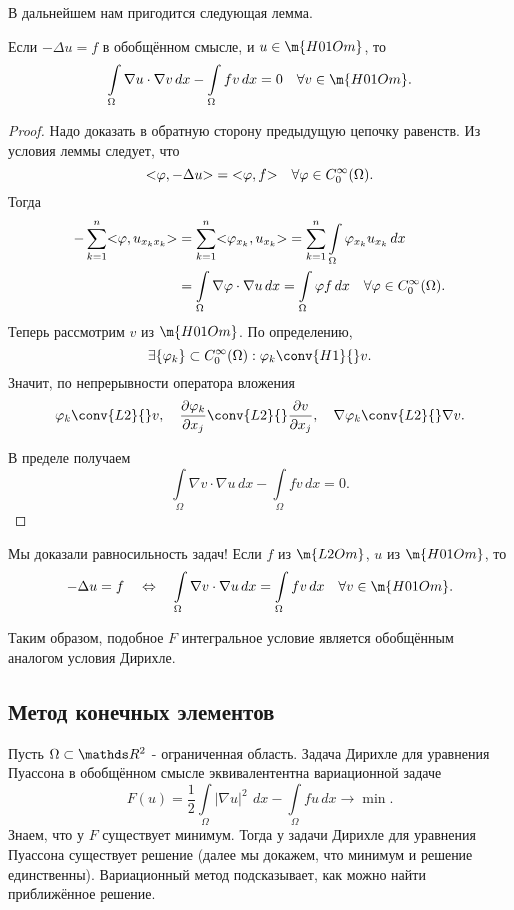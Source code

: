 В дальнейшем нам пригодится следующая лемма.
\begin{lemma}
Если $-\Delta u = f$ в обобщённом смысле, и $u \in \m{H01Om}$, то
$$ \int \limits_\Omega \nabla u \cdot \nabla v \, dx - \int \limits_\Omega fv \, dx = 0 \quad \forall v \in \m{H01Om}.$$
\end{lemma}
\begin{proof} Надо доказать в обратную сторону предыдущую цепочку равенств. Из условия леммы следует, что 
$$ \action{\varphi, -\Delta u} = \action{\varphi, f} \quad \forall \varphi \in C_0^\infty(\Omega).$$
Тогда 
\begin{align*}
- \sum_{k=1}^n \action{\varphi, u_{x_k x_k}} &= \sum_{k=1}^n \action{\varphi_{x_k}, u_{x_k}} = \sum_{k=1}^n \int \limits_\Omega \varphi_{x_k} u_{x_k} \, dx \\
&= \int \limits_\Omega \nabla \varphi \cdot \nabla u \, dx = \int \limits_\Omega \varphi f \, dx \quad \forall \varphi \in C_0^\infty(\Omega).
\end{align*}
Теперь рассмотрим $v$ из $\m{H01Om}$. По определению,
$$ \exists \{ \varphi_k \} \subset C_0^\infty(\Omega) : \varphi_k \conv{H1}{} v.$$
Значит, по непрерывности оператора вложения
$$ \varphi_k \conv{L2}{} v, \quad \pder[\varphi_k]{x_j} \conv{L2}{} \pder[v]{x_j}, \quad \nabla \varphi_k \conv{L2}{} \nabla v.$$

В пределе получаем
$$ \int \limits_\Omega \nabla v \cdot \nabla u \, dx - \int \limits_\Omega fv \, dx = 0.$$

\end{proof}

\begin{note} Мы доказали равносильность задач! Если $f$ из $\m{L2Om}$, $u$ из $\m{H01Om}$, то
$$ -\Delta u = f \quad \Leftrightarrow \quad \int \limits_\Omega \nabla v \cdot \nabla u \, dx = \int \limits_\Omega fv \, dx \quad \forall v \in \m{H01Om}.$$
\end{note}

Таким образом, подобное $F$ интегральное условие является обобщённым аналогом условия Дирихле.


\subsection{Метод конечных элементов} Пусть $\Omega \subset \real^2$ - ограниченная область. Задача Дирихле для уравнения Пуассона в обобщённом смысле эквивалентентна вариационной задаче
$$ F(u) = \frac {1}{2} \int \limits_\Omega |\nabla u|^2\ \,dx - \int \limits_\Omega fu \, dx \rightarrow \min.$$
Знаем, что у $F$ существует минимум. Тогда у задачи Дирихле для уравнения Пуассона существует решение (далее мы докажем, что минимум и решение единственны). Вариационный метод подсказывает, как можно найти приближённое решение.

